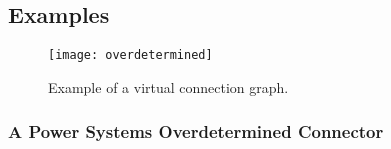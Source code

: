 \subsection{Examples}\label{examples-of-overconstrained-connectors}

\begin{example}
\begin{figure}[H]
  \begin{center}
    \texttt{[image: overdetermined]}
  \end{center}
  \caption{Example of a virtual connection graph.}
\end{figure}
\end{example}

\subsubsection{A Power Systems Overdetermined Connector}\label{an-overdetermined-connector-for-power-systems}\label{a-power-systems-overdetermined-connector}

